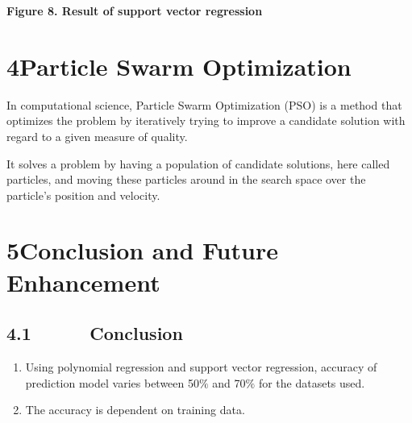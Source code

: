 \documentclass[12pt]{article}
\begin{document}

\par

\begin{Center}
\textbf{Figure 8. Result of support vector regression}
\end{Center}\par


\vspace{\baselineskip}
\section*{4\hspace*{10pt}Particle Swarm Optimization}
In computational science, Particle Swarm Optimization (PSO) is a method that optimizes the problem by iteratively trying to improve a candidate solution with regard to a given measure of quality.\par

It solves a problem by having a population of candidate solutions, here called particles, and moving these particles around in the search space over the particle’s position and velocity.\par

\section*{5\hspace*{10pt}Conclusion and Future Enhancement}
\subsection*{4.1\ \ \ \ \ \  Conclusion}
\begin{enumerate}
	\item Using polynomial regression and support vector regression, accuracy of prediction model varies between 50$\%$  and 70$\%$  for the datasets used.\par

	\item The accuracy is dependent on training data.
\end{enumerate}\par
\end{document}
